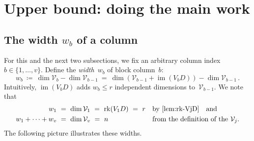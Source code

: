 \documentclass{lmcs}
\theoremstyle{definition}
\DeclareMathOperator{\im}{im}
\newcommand{\rk}{\operatorname{rk}}
\newcommand{\V}{\mathcal{V}}
\begin{document}
\section{Upper bound: doing the main work}\label{sec:upper-two}



\subsection{The width \texorpdfstring{$w_b$}{} of a column} \label{sub:width}

For this and the next two subsections, we fix an arbitrary column index $b \in \{1, \ldots, v\}$.
Define the \emph{width}~$w_b$ of block column~$b$:
\[
w_b \ \coloneqq \ \dim \V_b - \dim \V_{b-1} \ = \ \dim(\V_{b-1} + \im(V_b D)) - \dim \V_{b-1}\,.
\]
Intuitively, $\im(V_b D)$ adds $w_b \le r$ independent dimensions to~$\V_{b-1}$.
We note that
\begin{equation} \label{eq:wj}
\begin{aligned}
 w_1 \ &= \ \dim \V_1 \ = \ \rk(V_1 D) \ = \ r    && \text{by \cref{lem:rk-VjD}\quad and}\\ 
 w_1 + \cdots + w_v \ &= \ \dim \V_v \ = \ n      && \text{from the definition of the $\V_j$.}
\end{aligned}
\end{equation}
The following picture illustrates these widths.
\begin{center}
\end{center}
\end{document}
